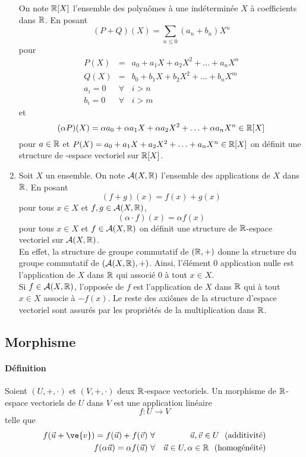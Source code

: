 \begin{enumerate}
    On note $\mathbb{R}[X]$ l'ensemble des polynômes à une indéterminée $X$ à coefficients dans $\mathbb{R}$. En posant $$(P + Q)(X) = \sum_{n \leq 0} (a_n + b_n)X^n$$ pour 
    \begin{eqnarray*}
      P(X) &=& a_0 + a_1 X + a_2 X^2 + \ldots + a_n X^{n} \\
      Q(X) &=& b_0 + b_1 X + b_2 X^2 + \ldots + b_n X^{m} \\
      a_i = 0 &\forall& i > n \\
      b_i = 0 &\forall& i > m
    \end{eqnarray*}
    et 
    $$(\alpha P)(X) = \alpha a_0 + \alpha a_1 X + \alpha a_2 X^2 + \ldots + \alpha a_n X^{n} \in \mathbb{R}[X]$$
    pour $a \in \mathbb{R}$ et $P(X) = a_0 + a_1 X + a_2 X^2 + \ldots + a_n X^{n} \in \mathbb{R}[X]$ on définit une structure de \R-espace vectoriel sur $\mathbb{R}[X]$.
  \item Soit $X$ un ensemble. On note $\mathcal{A}(X, \mathbb{R})$ l'ensemble des applications de $X$ dans $\mathbb{R}$. En posant
    $$(f + g)(x) = f(x) + g(x)$$
    pour tous $x \in X$ et $f, g \in \mathcal{A}(X, \mathbb{R})$,
    $$(\alpha \cdot f)(x) = \alpha f(x)$$
    pour tous $x \in X$ et $f \in \mathcal{A}(X, \mathbb{R})$ on définit une structure de $\mathbb{R}$-espace vectoriel sur $\mathcal{A}(X, \mathbb{R})$. \\
    
    En effet, la structure de groupe commutatif de $(\mathbb{R}, +)$ donne la structure du groupe commutatif de $(\mathcal{A}(X, \mathbb{R}), +)$. Ainsi, l'élément $0$ application nulle est l'application de $X$ dans $\mathbb{R}$ qui associé $0$ à tout $x \in X$. \\
    Si $f \in \mathcal{A}(X, \mathbb{R})$, l'opposée de $f$ est l'application de $X$ dans $\mathbb{R}$ qui à tout $x \in X$ associe à $-f(x)$. Le reste des axiômes de la structure d'espace vectoriel sont assurés par les propriétés de la multiplication dans $\mathbb{R}$.
\end{enumerate}

%
\subsection{Morphisme}
%
\paragraph{Définition} Soient $(U, +, \cdot)$ et $(V, +, \cdot)$ deux $\mathbb{R}$-espace vectoriels. Un morphisme de $\mathbb{R}$-espace vectoriels de $U$ dans $V$ est une application linéaire
  $$f: U \rightarrow V$$
  telle que
  \begin{eqnarray*}
    f(\vec{u} + \ve{v}) = f(\vec{u}) + f(\vec{v}) ~ &\forall&\vec{u}, \vec{v} \in U \mbox{~ (additivité)}\\
    f(\alpha \vec{u} ) = \alpha f(\vec{u}) ~ &\forall&\vec{u} \in U, \alpha \in \R \mbox{~ (homogénéité)}
  \end{eqnarray*}

